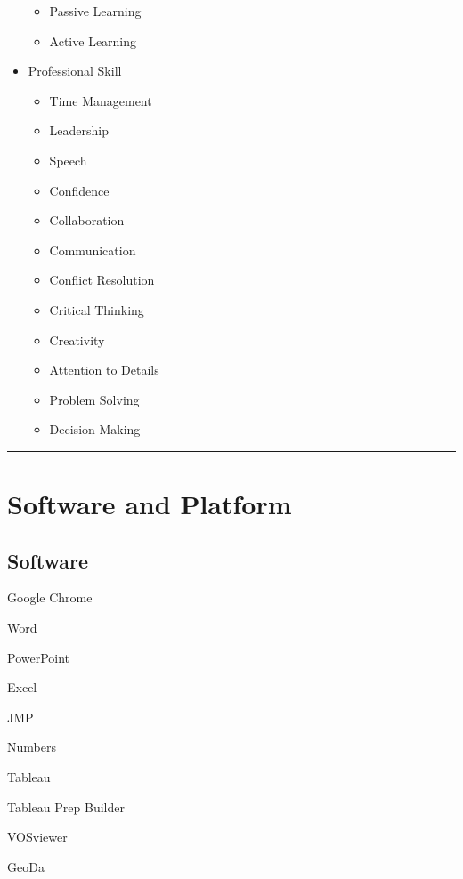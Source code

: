\documentclass[
]{book}
\providecommand{\tightlist}{%
  \setlength{\itemsep}{0pt}\setlength{\parskip}{0pt}}
\begin{document}
\begin{itemize}
  \begin{itemize}
  \tightlist
  \item
    Passive Learning
  \item
    Active Learning
  \end{itemize}
\item
  Professional Skill

  \begin{itemize}
  \tightlist
  \item
    Time Management
  \item
    Leadership
  \item
    Speech
  \item
    Confidence
  \item
    Collaboration
  \item
    Communication
  \item
    Conflict Resolution
  \item
    Critical Thinking
  \item
    Creativity
  \item
    Attention to Details
  \item
    Problem Solving
  \item
    Decision Making
  \end{itemize}
\end{itemize}

\begin{center}\rule{0.5\linewidth}{0.5pt}\end{center}

\hypertarget{software-and-platform}{%
\chapter{Software and Platform}\label{software-and-platform}}

\hypertarget{software}{%
\section{Software}\label{software}}

Google Chrome

Word

PowerPoint

Excel

JMP

Numbers

Tableau

Tableau Prep Builder

VOSviewer

GeoDa
\end{document}
